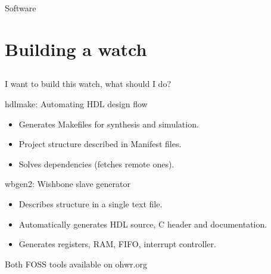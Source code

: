 \documentclass[compress,red]{beamer}
\begin{document}
\begin{frame}{Software}

  \begin{center}
  \end{center}

  \note[item]{}

\end{frame}


\section{Building a watch}

\subsection*{} %

\begin{frame}{I want to build this watch, what should I do?}

  \begin{block}{hdlmake: Automating HDL design flow}
    \begin{itemize}
    \item Generates Makefiles for synthesis and simulation.
    \item Project structure described in Manifest files.
    \item Solves dependencies (fetches remote ones).
    \end{itemize}
  \end{block}

  \begin{block}{wbgen2: Wishbone slave generator}
    \begin{itemize}
    \item Describes structure in a single text file.
    \item Automatically generates HDL source, C header and documentation.
    \item Generates registers, RAM, FIFO, interrupt controller.
    \end{itemize}
  \end{block}

  \begin{block}{}
    \begin{center}
      Both FOSS tools available on ohwr.org
    \end{center}
  \end{block}

  \note[item]{}

\end{frame}
\end{document}
